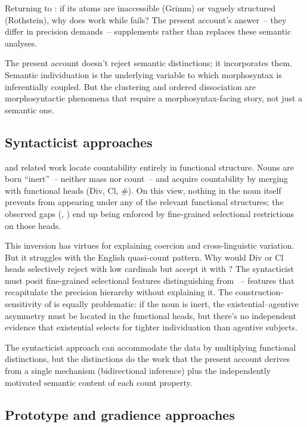 \documentclass[12pt,a4paper]{article}
\begin{document}
Returning to : if its atoms are inaccessible (Grimm) or vaguely structured (Rothstein), why does  work while  fails? The present account's answer~-- they differ in precision demands~-- supplements rather than replaces these semantic analyses.

The present account doesn't reject semantic distinctions; it incorporates them. Semantic individuation is the underlying variable to which morphosyntax is inferentially coupled. But the clustering and ordered dissociation are morphosyntactic phenomena that require a morphosyntax-facing story, not just a semantic one.

\subsection{Syntacticist approaches}

\textcite{borer2005} and related work locate countability entirely in functional structure. Nouns are born \enquote{inert}~-- neither mass nor count~-- and acquire countability by merging with functional heads (Div, Cl, \#). On this view, nothing in the noun itself prevents  from appearing under any of the relevant functional structures; the observed gaps (, ) end up being enforced by fine-grained selectional restrictions on those heads.

This inversion has virtues for explaining coercion and cross-linguistic variation. But it struggles with the English quasi-count pattern. Why would Div or Cl heads selectively reject  with low cardinals but accept it with ? The syntacticist must posit fine-grained selectional features distinguishing  from ~-- features that recapitulate the precision hierarchy without explaining it. The construction-sensitivity of  is equally problematic: if the noun is inert, the existential--agentive asymmetry must be located in the functional heads, but there's no independent evidence that existential  selects for tighter individuation than agentive subjects.

The syntacticist approach can accommodate the data by multiplying functional distinctions, but the distinctions do the work that the present account derives from a single mechanism (bidirectional inference) plus the independently motivated semantic content of each count property.

\subsection{Prototype and gradience approaches}
\end{document}
